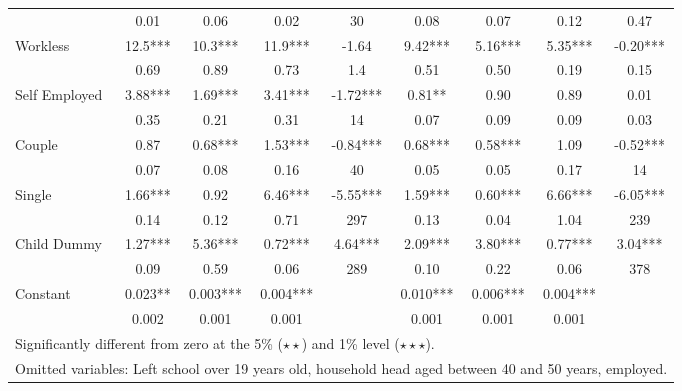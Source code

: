 \begin{sidewaystable}
\begin{tabular}{l|cccc|cccc}
                    	&	       0.01   	&	0.06	&	0.02	&	30	&	    
				   0.08  	&	0.07	&	0.12	&	0.47	\\
Workless	&	       12.5***	&	       10.3***	&	       11.9***	&	-1.64	&	       									9.42***	&	      5.16***	&	       5.35***	&	-0.20***	\\
	&	       0.69   	&	0.89	&	0.73	&	1.4	&	
		       0.51   	&	0.50	&	0.19	&	0.15	\\
Self Employed	&	       3.88***	&	      1.69***	&	       3.41***	&	-1.72***	&	       							0.81**	&	       0.90 &	       0.89	&	0.01	\\
	&	       0.35   	&	0.21	&	0.31	&	14	&	
		       0.07   	&	0.09	&	0.09	&	0.03	\\
Couple	&	       0.87	&	      0.68***	&	       1.53***	&	-0.84***	&	       							0.68***	&	       0.58*** &	       1.09	&	-0.52***	\\
	&	       0.07  	&	0.08	&	0.16	&	40	&	
		       0.05   	&	0.05	&	0.17	&	14	\\
Single	&	       1.66***	&	      0.92	&	       6.46***	&	-5.55***	&	       							1.59***	&	       0.60***&	      6.66*** &	-6.05***	\\
	&	       0.14   	&	0.12	&	0.71	&	297	&	
		       0.13   	&	0.04	&	1.04	&	239	\\
Child Dummy	&	       1.27***	&	      5.36***	&	      0.72***	&	4.64***	&	       							2.09***	&	       3.80*** &	       0.77***	&	3.04***	\\
	&	       0.09   	&	0.59	&	0.06	&	289	&	
		       0.10   	&	0.22	&	0.06	&	378	\\
Constant            	&	       0.023**	&	       0.003***	&	0.004***	&		&	
				       0.010***	&	       0.006***	&	       0.004***	&		\\
                    	&	       0.002   	&	0.001	&	       0.001 	&		&	 
			      0.001   	&	0.001	&	0.001	&		\\
\hline\hline
\multicolumn{9}{l}{Significantly different from zero at the 5\% ($\star\star$) and 1\% level ($\star\star\star$).} \\
\multicolumn{9}{l}{Omitted variables: Left school over 19 years old, household head aged between 40 and 50 years, employed. } 
\end{tabular}
\label{table:ahc_bhc}
\end{sidewaystable}


